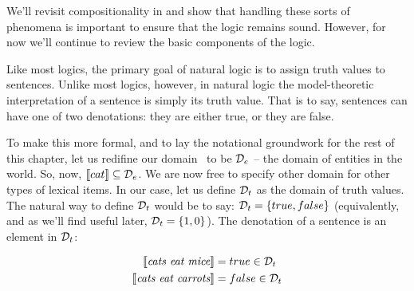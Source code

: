 We'll revisit compositionality in  and show that handling these sorts
  of phenomena is important to ensure that the logic remains sound.
However, for now we'll continue to review the basic components of the logic.


Like most logics, the primary goal of natural logic is to assign truth
  values to sentences.
Unlike most logics, however, in natural logic the model-theoretic interpretation of
  a sentence is simply its truth value.
That is to say, sentences can have one of two denotations: they are either true, or they
  are false.

To make this more formal, and to lay the notational groundwork for the rest of this chapter,
  let us redifine our domain \sD\ to be $\mathcal{D}_e$ -- the domain of entities in the world.
So, now, $\llbracket cat \rrbracket \subseteq \mathcal{D}_e$.
We are now free to specify other domain for other types of lexical items.
In our case, let us define $\mathcal{D}_t$ as the domain of truth values.
The natural way to define $\mathcal{D}_t$ would be to say: $\mathcal{D}_t = \{true, false\}$
  (equivalently, and as we'll find useful later, $\mathcal{D}_t = \{1, 0\}$).
The denotation of a sentence is an element in $\mathcal{D}_t$:

\begin{align*}
\llbracket\textit{cats eat mice}\rrbracket &= true \in \mathcal{D}_t \\
\llbracket\textit{cats eat carrots}\rrbracket &= false \in \mathcal{D}_t
\end{align*}

%
%




